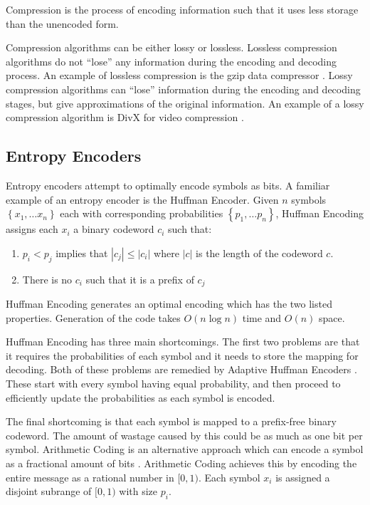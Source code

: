\documentclass[a4paper]{report}
\begin{document}
Compression is the process of encoding information such that it uses less
storage than the unencoded form.

Compression algorithms can be either lossy or lossless. Lossless compression
algorithms do not ``lose'' any information during the encoding and decoding
process. An example of lossless compression is the gzip data compressor
\citep{gzip}. Lossy compression algorithms can ``lose'' information during the
encoding and decoding stages, but give approximations of the original
information. An example of a lossy compression algorithm is DivX for video
compression \citep{divx}.

\subsection{Entropy Encoders}

Entropy encoders attempt to optimally encode symbols as bits. A familiar
example of an entropy encoder is the Huffman Encoder. Given $n$ symbols
$\left\{x_1, \dots x_n \right\}$ each with corresponding probabilities
$\left\{p_1, \dots p_n \right\}$, Huffman Encoding assigns each $x_i$ a binary
codeword $c_i$ such that: \citep{huffman1952method}
\begin{enumerate}
  \item $p_i < p_j$ implies that $|c_j| \le |c_i|$ where $|c|$ is the length
    of the codeword $c$.
  \item There is no $c_i$ such that it is a prefix of $c_j$
\end{enumerate}

Huffman Encoding generates an optimal encoding which has the two listed
properties. Generation of the code takes $O(n \log n)$ time and $O(n)$ space.

Huffman Encoding has three main shortcomings. The first two problems are that
it requires the probabilities of each symbol and it needs to store the mapping
for decoding. Both of these problems are remedied by Adaptive Huffman Encoders
\citep{drozdek,vitter1987}. These start with every symbol having equal
probability, and then proceed to efficiently update the probabilities as each
symbol is encoded.

The final shortcoming is that each symbol is mapped to a prefix-free binary
codeword. The amount of wastage caused by this could be as much as one bit per
symbol. Arithmetic Coding is an alternative approach which can encode a symbol
as a fractional amount of bits \citep{drozdek}. Arithmetic Coding achieves
this by encoding the entire message as a rational number in $[0,1)$. Each
  symbol $x_i$ is assigned a disjoint subrange of $[0,1)$ with size $p_i$.
\end{document}
